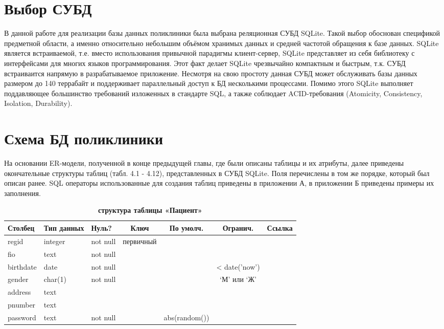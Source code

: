 \documentclass[14pt,a4paper,russian]{extreport}
\begin{document}
\section{Выбор СУБД}
В данной работе для реализации базы данных поликлиники была выбрана реляционная СУБД
SQLite. Такой выбор обоснован спецификой предметной области, а именно относительно небольшим
объёмом хранимых данных и средней частотой обращения к базе данных. SQLite является
встраиваемой, т.е. вместо использования привычной парадигмы клиент-сервер, SQLite представляет из
себя библиотеку с интерфейсами для многих языков программирования. Этот факт делает SQLite
чрезвычайно компактным и быстрым, т.к. СУБД встраиваится напрямую в разрабатываемое приложение.
Несмотря на свою простоту данная СУБД может обслуживать базы данных размером до 140 террабайт и
поддерживает параллельный доступ к БД несколькими процессами. Помимо этого SQLite выполняет
поддавляющее большинство требований изложенных в стандарте SQL, а также соблюдает ACID-требования
(Atomicity, Consistency, Isolation, Durability).\cite{sqlite}


\section{Схема БД поликлиники}
На основании ER-модели, полученной в конце предыдущей главы, где были описаны таблицы и их атрибуты,
далее приведены окончательные структуры таблиц (табл. 4.1 - 4.12), представленных в СУБД SQLite. Поля перечислены в
том же порядке, который был описан ранее. SQL операторы
использованные для создания таблиц приведены в приложении А, в приложении Б приведены примеры их
заполнения.


\begin{table}[h]
    \caption{ } 
    \begin{subtable}[t]{\textwidth}
        \caption{\textbf{структура таблицы «Пациент»}}
    \begin{tabularx}{\textwidth}{| X | X | X | c | c | c | X |}
        \hline
        \textbf{Столбец} & \textbf{Тип данных} & \textbf{Нуль?} & \textbf{Ключ} & \textbf{По
        умолч.} & \textbf{Огранич.} & \textbf{Ссылка} \\ \hline
        regid & integer & not null & первичный & & & \\ \hline
        fio & text & not null & & & & \\ \hline
        birthdate & date & not null & & & < date('now') & \\ \hline
        gender & char(1) & not null & & & `М' или `Ж' & \\ \hline
        address & text & & & & & \\ \hline
        pnumber & text & & & & & \\ \hline
        password & text & not null & & abs(random()) & & \\ \hline
    \end{tabularx}
    \end{subtable}
    \label{table:pat}
\end{table}
\end{document}

